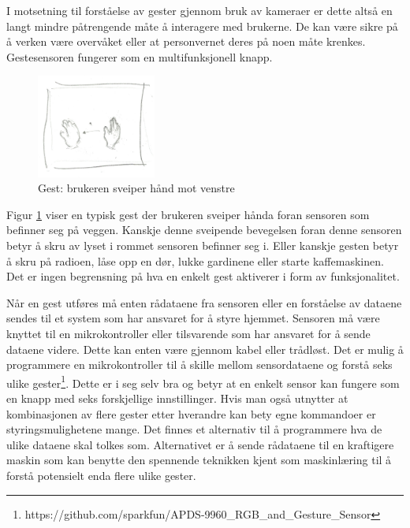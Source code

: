 I motsetning til forståelse av gester gjennom bruk av kameraer er dette altså en langt mindre påtrengende måte å interagere med brukerne. De kan være sikre på å verken være overvåket eller at personvernet deres på noen måte krenkes. Gestesensoren fungerer som en multifunksjonell knapp.\\
\begin{figure}
    \vspace{-20pt}
  \begin{center}
    \includegraphics[width=0.35\textwidth]{fig/swipe-l-r}
  \end{center}
  \vspace{-20pt}
  \caption{Gest: brukeren sveiper hånd mot venstre}
  \label{fig:gest}
  \vspace{-7pt}
\end{figure}
Figur \ref{fig:gest} viser en typisk gest der brukeren sveiper hånda foran sensoren som befinner seg på veggen. Kanskje denne sveipende bevegelsen foran denne sensoren betyr å skru av lyset i rommet sensoren befinner seg i. Eller kanskje gesten betyr å skru på radioen, låse opp en dør, lukke gardinene eller starte kaffemaskinen. Det er ingen begrensning på hva en enkelt gest aktiverer i form av funksjonalitet.

Når en gest utføres må enten rådataene fra sensoren eller en forståelse av dataene sendes til et system som har ansvaret for å styre hjemmet. Sensoren må være knyttet til en mikrokontroller eller tilsvarende som har ansvaret for å sende dataene videre. Dette kan enten være gjennom kabel eller trådløst. Det er mulig å programmere en mikrokontroller til å skille mellom sensordataene og forstå seks ulike gester\footnote{https://github.com/sparkfun/APDS-9960\_RGB\_and\_Gesture\_Sensor}. Dette er i seg selv bra og betyr at en enkelt sensor kan fungere som en knapp med seks forskjellige innstillinger. Hvis man også utnytter at kombinasjonen av flere gester etter hverandre kan bety egne kommandoer er styringsmulighetene mange. Det finnes et alternativ til å programmere hva de ulike dataene skal tolkes som. Alternativet er å sende rådataene til en kraftigere maskin som kan benytte den spennende teknikken kjent som maskinlæring til å forstå potensielt enda flere ulike gester.

